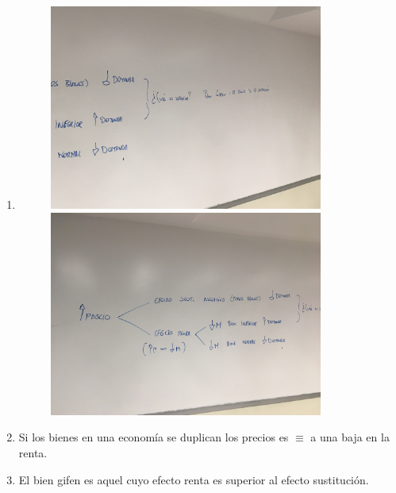 \begin{enumerate}
    \item \begin{center}
        \begin{figure}[htbp]
            \centering
            \includegraphics[width=9cm]{Classes/Images/photo-2.jpeg}
            \includegraphics[width=9cm]{Classes/Images/photo.jpeg}
            \caption{}
            \label{}
        \end{figure}
    \end{center}
    
    \item Si los bienes en una economía se duplican los precios es $\equiv$ a una baja en la renta.
    \item El bien gifen es aquel cuyo efecto renta es superior al efecto sustitución.  
\end{enumerate}

